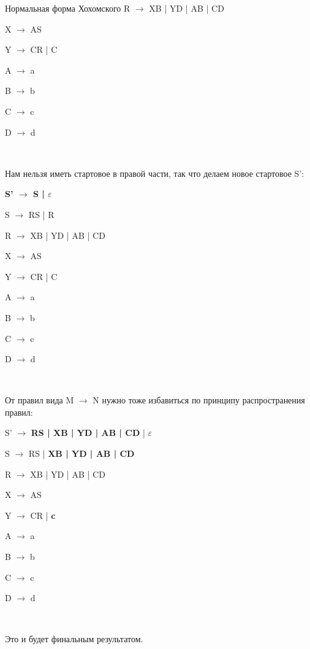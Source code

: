\documentclass[12pt]{article}
\begin{document}
\begin{section}{Нормальная форма Хохомского}
    R $\to$ XB | YD | AB | CD

    X $\to$ AS

    Y $\to$ CR | C

    A $\to$ a

    B $\to$ b

    C $\to$ c

    D $\to$ d


\

    Нам нельзя иметь стартовое в правой части, так что делаем новое стартовое S':

    \textbf{S' $\to$ S | $\varepsilon$}

    S $\to$ RS | R
    
    R $\to$ XB | YD | AB | CD

    X $\to$ AS

    Y $\to$ CR | C

    A $\to$ a

    B $\to$ b

    C $\to$ c

    D $\to$ d

\

    От правил вида M $\to$ N нужно тоже избавиться по принципу распространения правил:


    S' $\to$   \textbf{RS | XB | YD | AB | CD} | $\varepsilon$

    S $\to$ RS | \textbf{XB | YD | AB | CD}
    
    R $\to$ XB | YD | AB | CD

    X $\to$ AS

    Y $\to$ CR | \textbf{c}

    A $\to$ a

    B $\to$ b

    C $\to$ c

    D $\to$ d


\

    Это и будет финальным результатом.

\end{section}
\end{document}
